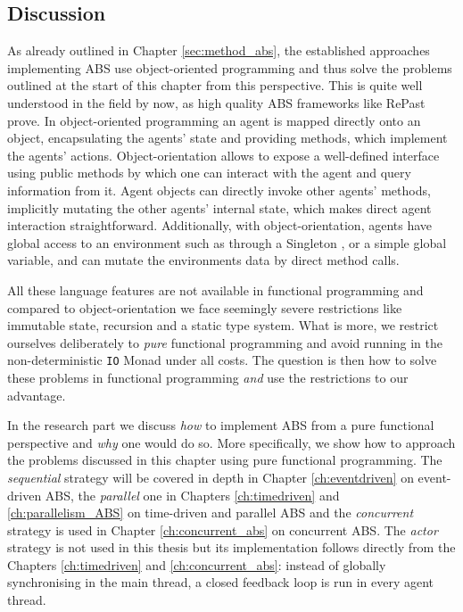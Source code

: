 \subsection{Discussion}
As already outlined in Chapter \ref{sec:method_abs}, the established approaches implementing ABS use object-oriented programming and thus solve the problems outlined at the start of this chapter from this perspective. This is quite well understood  in the field by now, as high quality ABS frameworks like RePast \cite{north_complex_2013} prove. In object-oriented programming an agent is mapped directly onto an object, encapsulating the agents' state and providing methods, which implement the agents' actions. Object-orientation allows to expose a well-defined interface using public methods by which one can interact with the agent and query information from it. Agent objects can directly invoke other agents' methods, implicitly mutating the other agents' internal state, which makes direct agent interaction straightforward. Additionally, with object-orientation, agents have global access to an environment such as through a Singleton \cite{gamma_design_1994}, or a simple global variable, and can mutate the environments data by direct method calls.

All these language features are not available in functional programming and compared to object-orientation we face seemingly severe restrictions like immutable state, recursion and a static type system. What is more, we restrict ourselves deliberately to \textit{pure} functional programming and avoid running in the non-deterministic \texttt{IO} Monad under all costs. The question is then how to solve these problems in functional programming \textit{and} use the restrictions to our advantage.

In the research part we discuss \textit{how} to implement ABS from a pure functional perspective and \textit{why} one would do so. More specifically, we show how to approach the problems discussed in this chapter using pure functional programming. The \textit{sequential} strategy will be covered in depth in Chapter \ref{ch:eventdriven} on event-driven ABS, the \textit{parallel} one in Chapters \ref{ch:timedriven} and \ref{ch:parallelism_ABS} on time-driven and parallel ABS and the \textit{concurrent} strategy is used in Chapter \ref{ch:concurrent_abs} on concurrent ABS. The \textit{actor} strategy is not used in this thesis but its implementation follows directly from the Chapters \ref{ch:timedriven} and \ref{ch:concurrent_abs}: instead of globally synchronising in the main thread, a closed feedback loop is run in every agent thread.